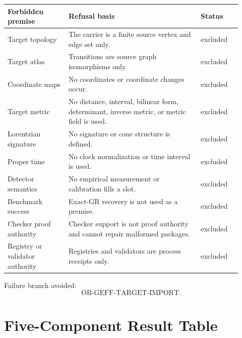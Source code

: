 \documentclass[11pt]{article}
\newcommand{\OBGEFF}{\mathrm{OB\mbox{-}GEFF}}
\begin{document}
\begin{longtable}{p{0.24\linewidth}p{0.52\linewidth}p{0.16\linewidth}}
\toprule
Forbidden premise & Refusal basis & Status \\
\midrule
Target topology & The carrier is a finite source vertex and edge set only. & excluded \\
Target atlas & Transitions are source graph isomorphisms only. & excluded \\
Coordinate maps & No coordinates or coordinate changes occur. & excluded \\
Target metric & No distance, interval, bilinear form, determinant, inverse metric, or metric field is used. & excluded \\
Lorentzian signature & No signature or cone structure is defined. & excluded \\
Proper time & No clock normalization or time interval is used. & excluded \\
Detector semantics & No empirical measurement or calibration fills a slot. & excluded \\
Benchmark success & Exact-GR recovery is not used as a premise. & excluded \\
Checker proof authority & Checker support is not proof authority and cannot repair malformed packages. & excluded \\
Registry or validator authority & Registries and validators are process receipts only. & excluded \\
\bottomrule
\end{longtable}

Failure branch avoided:
\[
  \OBGEFF\text{-TARGET-IMPORT}.
\]

\section{Five-Component Result Table}
\end{document}
